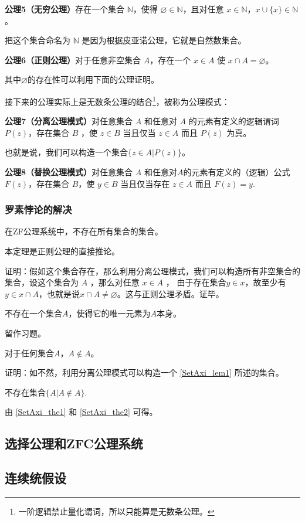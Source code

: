 \textbf{公理5（无穷公理）}存在一个集合 $\mathbb{N}$，使得 $\varnothing\in\mathbb{N}$，且对任意 $x\in \mathbb{N}$，$x\cup\{x\}\in\mathbb{N}$。

把这个集合命名为 $\mathbb{N}$ 是因为根据皮亚诺公理，它就是自然数集合。

\textbf{公理6（正则公理）}对于任意非空集合 $A$，存在一个 $x\in A$ 使 $x\cap A=\varnothing$。

其中$\varnothing$的存在性可以利用下面的公理证明。

接下来的公理实际上是无数条公理的结合\footnote{一阶逻辑禁止量化谓词，所以只能算是无数条公理。}，被称为公理模式：

\textbf{公理7（分离公理模式）}对任意集合 $A$ 和任意对 $A$ 的元素有定义的逻辑谓词 $P(z)$，存在集合 $B$ ，使 $z\in B$ 当且仅当 $z\in A$ 而且 $P(z)$ 为真。

也就是说，我们可以构造一个集合$\{z\in A | P(z)\}$。

\textbf{公理8（替换公理模式）}对任意集合 $A$ 和任意对$A$的元素有定义的（逻辑）公式$F(z)$，存在集合 $B$，使 $y\in B$ 当且仅当存在 $z\in A$ 而且 $F(z)=y$.

\subsubsection{罗素悖论的解决}
\begin{theorem}{}
在ZF公\label{SetAxi_the1}理系统中，不存在所有集合的集合。
\end{theorem}

本定理是正则公理的直接推论。

证明：假如这个集合存在，那么利用分离公理模式，我们可以构造所有非空集合的集合，设这个集合为 $A$ ，那么对任意 $x\in A$ ， 由于存在集合$y\in x$，故至少有$y\in x\cap A$，也就是说$x\cap A\neq\varnothing$。这与正则公理矛盾。证毕。

\begin{lemma}{}\label{SetAxi_lem1}
不存在一个集合$A$，使得它的唯一元素为$A$本身。
\end{lemma}

留作习题。

\begin{theorem}{}\label{SetAxi_the2}
对于任何集合$A$，$A\notin A$。
\end{theorem}

证明：如不然，利用分离公理模式可以构造一个 \autoref{SetAxi_lem1} 所述的集合。

\begin{theorem}{}
不存在集合$\{A|A\notin A\}$.
\end{theorem}

由 \autoref{SetAxi_the1} 和 \autoref{SetAxi_the2} 可得。

\subsection{选择公理和ZFC公理系统}

\subsection{连续统假设}




